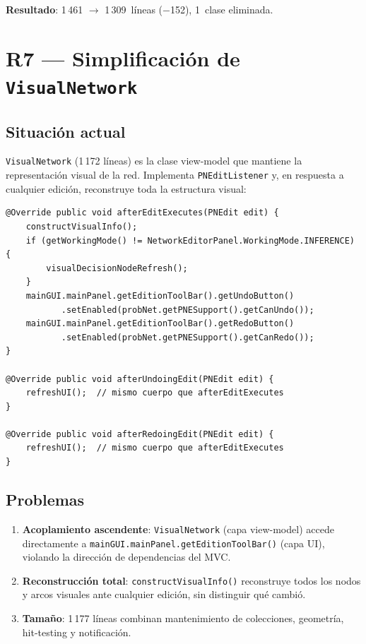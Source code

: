 \documentclass[12pt,a4paper]{article}
\newcommand{\code}[1]{\texttt{#1}}
\newcommand{\clase}[1]{\texttt{#1}}
\newcommand{\metodo}[1]{\texttt{#1}}
\newcommand{\warn}[1]{\textcolor{warnorange}{\textbf{#1}}}
\begin{document}
\textbf{Resultado}: 1\,461 $\to$ 1\,309~líneas ($-$152), 1~clase
eliminada.

\section{R7 --- Simplificación de \clase{VisualNetwork}}
\label{sec:r7}

\subsection{Situación actual}

\clase{VisualNetwork} (1\,172 líneas) es la clase view-model que
mantiene la representación visual de la red. Implementa
\code{PNEditListener} y, en respuesta a cualquier edición, reconstruye
toda la estructura visual:

\begin{lstlisting}[caption={Métodos \code{PNEditListener} en \clase{VisualNetwork}}]
@Override public void afterEditExecutes(PNEdit edit) {
    constructVisualInfo();
    if (getWorkingMode() != NetworkEditorPanel.WorkingMode.INFERENCE) {
        visualDecisionNodeRefresh();
    }
    mainGUI.mainPanel.getEditionToolBar().getUndoButton()
           .setEnabled(probNet.getPNESupport().getCanUndo());
    mainGUI.mainPanel.getEditionToolBar().getRedoButton()
           .setEnabled(probNet.getPNESupport().getCanRedo());
}

@Override public void afterUndoingEdit(PNEdit edit) {
    refreshUI();  // mismo cuerpo que afterEditExecutes
}

@Override public void afterRedoingEdit(PNEdit edit) {
    refreshUI();  // mismo cuerpo que afterEditExecutes
}
\end{lstlisting}

\subsection{Problemas}

\begin{enumerate}
  \item \warn{Acoplamiento ascendente}: \clase{VisualNetwork} (capa
        view-model) accede directamente a
        \code{mainGUI.mainPanel.getEditionToolBar()} (capa UI), violando
        la dirección de dependencias del MVC.
  \item \warn{Reconstrucción total}: \metodo{constructVisualInfo()}
        reconstruye todos los nodos y arcos visuales ante cualquier
        edición, sin distinguir qué cambió.
  \item \warn{Tamaño}: 1\,177 líneas combinan mantenimiento de
        colecciones, geometría, hit-testing y notificación.
\end{enumerate}
\end{document}
